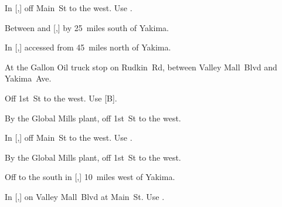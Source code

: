 
\begin{LocationList}

In [,] off Main~St to the west.
Use  .

Between  and [,] by  25~miles south of Yakima.

In [,] accessed from  45~miles north of Yakima.

At the Gallon Oil truck stop on Rudkin~Rd, between Valley Mall~Blvd and Yakima~Ave.

Off 1st~St to the west.
Use  [B].

By the Global Mills plant, off 1st~St to the west.

In [,] off Main~St to the west.
Use  .

\Location{\RecruitmentAgency \Recruitment}
By the Global Mills plant, off 1st~St to the west.

Off  to the south in [,] 10~miles west of Yakima.

In [,] on Valley Mall~Blvd at Main~St.
Use  .

\end{LocationList}
